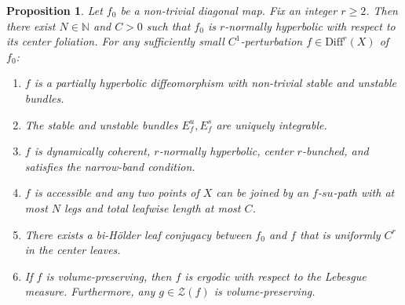 \documentclass[11pt]{amsart}
\numberwithin{equation}{section}
\theoremstyle{plain}
\newtheorem{prop}[thm]{Proposition}
\begin{document}
\begin{prop}\label{fparhyp}
Let $f_0$ be a non-trivial diagonal map. Fix an integer $r\ge2$.
Then there exist $N\in\mathbb N$ and $C>0$ such that $f_0$ is
$r$-normally hyperbolic with respect to its center foliation. For any
sufficiently small $C^1$-perturbation $f \in \mathrm{Diff}^r(X)$ of $f_0$:
\begin{enumerate}
    \item $f$ is a partially hyperbolic diffeomorphism with non-trivial stable and unstable bundles.
    \item The stable and unstable bundles $E^u_f,E^s_f$ are uniquely integrable.
    \item $f$ is dynamically coherent, $r$-normally hyperbolic,
    center $r$-bunched, and satisfies the narrow-band
    condition.
    \item $f$ is accessible and any  two
points of $X$ can be joined by an $f$-$su$-path  with at most $N$ legs and
 total leafwise length  at most $C$.

    \item There exists a bi-H\"older leaf conjugacy between $f_0$ and $f$ that is uniformly $C^r$ in the center leaves.
    \item If $f$ is volume-preserving, then $f$ is ergodic with respect to the Lebesgue measure. Furthermore, any $g\in \mathcal Z(f)$ is volume-preserving.
\end{enumerate}
\end{prop}
\end{document}

